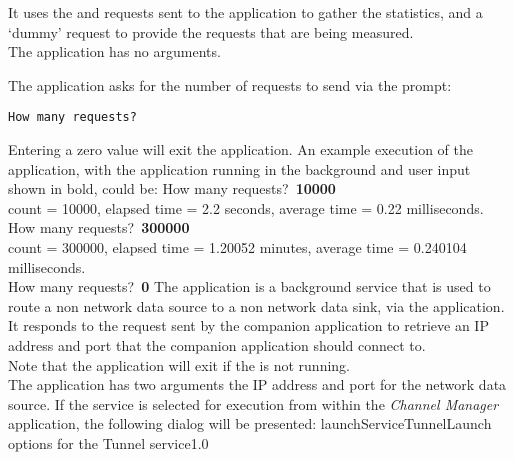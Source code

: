 It uses the  and
 requests sent to the
 application to gather the statistics, and a
`dummy' request to provide the requests that are being measured.\\

The application has no arguments.
\insertShortClientParameters{}

The application asks for the number of requests to send via the prompt:
\outputBegin
\begin{verbatim}
How many requests?
\end{verbatim}
\outputEnd{}
Entering a zero value will exit the application.
An example execution of the application, with the 
application running in the background and user input shown in bold, could be:
\outputBegin{}
How many requests?\ \textbf{10000}\\
count = 10000, elapsed time = 2.2 seconds, average time = 0.22 milliseconds.\\
How many requests?\ \textbf{300000}\\
count = 300000, elapsed time = 1.20052 minutes, average time = 0.240104 milliseconds.\\
How many requests?\ \textbf{0}
\outputEnd
{}
\condPage
{}
The  application is a background service that is used to
route a non\longDash\yarp{} network data source to a non\longDash\yarp{} network data
sink, via the  application.\\

It responds to the  request sent by the
companion application  to retrieve an IP address and port
that the companion application should connect to.\\

Note that the application will exit if the
 is not running.\\

The application has two arguments \longDash{} the IP address and port for the network data
source.
\insertAutoAppParameters
{}
\condPage
If the service is selected for execution from within the \emph{Channel Manager}
application, the following dialog will be presented:
%
{launchServiceTunnel}{Launch options for the Tunnel service}{1.0}


